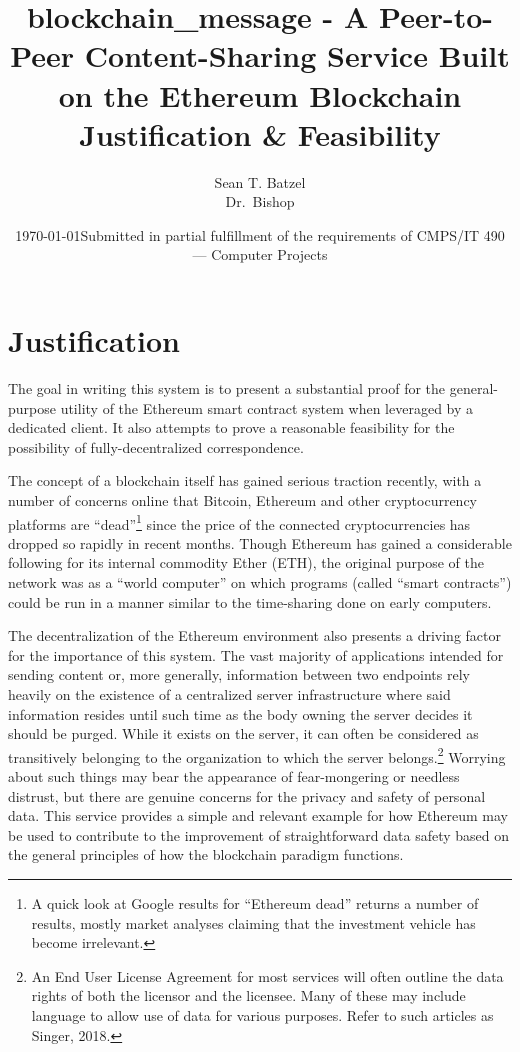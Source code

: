 \documentclass[titlepage]{report}
\title{blockchain\_message - A Peer-to-Peer Content-Sharing Service Built on the Ethereum Blockchain\\\large Justification \& Feasibility}
\author{Sean T. Batzel\\Dr.\ Bishop}
\date{\today\endgraf\bigskip Submitted in partial fulfillment of the requirements of CMPS/IT 490 --- Computer Projects}
\begin{document}
\maketitle

\nocite{*}

\section{Justification}
The goal in writing this system is to present a substantial proof for the general-purpose utility of the Ethereum \gls{smart contract} system when leveraged by a dedicated client. It also attempts to prove a reasonable feasibility for the possibility of fully-decentralized correspondence.

The concept of a \gls{blockchain} itself has gained serious traction recently, with a number of concerns online that Bitcoin, Ethereum and other cryptocurrency platforms are ``dead''\footnote{A quick look at Google results for ``Ethereum dead'' returns a number of results, mostly market analyses claiming that the investment vehicle has become irrelevant.} since the price of the connected cryptocurrencies has dropped so rapidly in recent months. Though Ethereum has gained a considerable following for its internal commodity Ether (ETH), the original purpose of the network was as a ``world computer'' on which programs (called ``smart contracts'') could be run in a manner similar to the time-sharing done on early computers.

The decentralization of the Ethereum environment also presents a driving factor for the importance of this system. The vast majority of applications intended for sending content or, more generally, information between two endpoints rely heavily on the existence of a centralized server infrastructure where said information resides until such time as the body owning the server decides it should be purged. While it exists on the server, it can often be considered as transitively belonging to the organization to which the server belongs.\footnote{An End User License Agreement for most services will often outline the data rights of both the licensor and the licensee. Many of these may include language to allow use of data for various purposes. Refer to such articles as Singer, 2018.\cite{singer}} Worrying about such things may bear the appearance of fear-mongering or needless distrust, but there are genuine concerns for the privacy and safety of personal data. This service provides a simple and relevant example for how Ethereum may be used to contribute to the improvement of straightforward data safety based on the general principles of how the blockchain paradigm functions.
\end{document}
